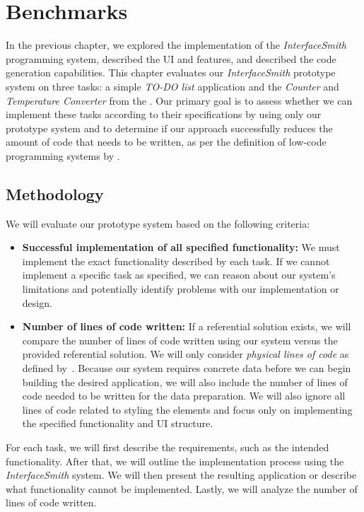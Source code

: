 \chapter{Benchmarks}
\label{chap:walktrough}

In the previous chapter, we explored the implementation of the \emph{InterfaceSmith} programming system, described the UI and features, and described the code generation capabilities.
This chapter evaluates our \emph{InterfaceSmith} prototype system on three tasks: a simple \emph{TO-DO list} application and the \emph{Counter} and \emph{Temperature Converter} from the \citet{7GUIs-web}.
Our primary goal is to assess whether we can implement these tasks according to their
specifications by using only our prototype system and to determine if our approach successfully
reduces the amount of code that needs to be written,
as per the definition of low-code programming systems by \citet{Pinho_Aguiar_Amaral_2023}.

\section{Methodology}
We will evaluate our prototype system based on the following criteria:
\begin{itemize}
	\item \textbf{Successful implementation of all specified functionality:}
	      We must implement the exact functionality described by each task.
	      If we cannot implement a specific task as specified, we can reason about our system's limitations and potentially
	      identify problems with our implementation or design.

	\item \textbf{Number of lines of code written:}
	      If a referential solution exists, we will compare the number of lines of code written using our system versus the provided referential solution.
	      We will only consider \emph{physical lines of code} as defined by~\citet{Park_1992}.
	      Because our system requires concrete data before we can begin building the desired application, we will also include the number of lines of code needed to be written for the data preparation.
	      We will also ignore all lines of code related to styling the elements and focus only on implementing the specified functionality and UI structure.
\end{itemize}

\noindent For each task, we will first describe the requirements, such as the intended functionality.
After that, we will outline the implementation process using the \emph{InterfaceSmith} system.
We will then present the resulting application or describe what functionality cannot be implemented.
Lastly, we will analyze the number of lines of code written.



